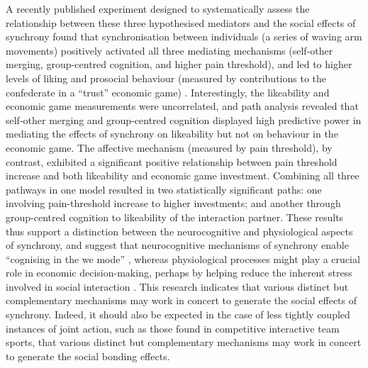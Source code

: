 \begin{CJK}{UTF8}{gbsn}
{A recently published experiment designed to systematically assess the relationship between these three hypothesised mediators and the social effects of synchrony found that synchronisation between individuals (a series of waving arm movements) positively activated all three mediating mechanisms (self-other merging, group-centred cognition, and higher pain threshold), and led to higher levels of liking and prosocial behaviour (measured by contributions to the confederate in a ``trust'' economic game) \citep{Lang2017}.  Interestingly, the likeability and economic game measurements were uncorrelated, and path analysis revealed that self-other merging and group-centred cognition displayed high predictive power
in mediating the effects of synchrony on likeability but not on behaviour in the economic game.  The affective mechanism (measured by pain threshold), by contrast, exhibited a significant positive relationship between pain threshold increase and both likeability and economic game investment.  Combining all three pathways in one model resulted in two statistically significant paths: one involving pain-threshold increase to higher investments; and another through group-centred cognition to likeability of the interaction partner.  These results thus support a distinction between the neurocognitive and physiological aspects of synchrony, and suggest that neurocognitive mechanisms of synchrony enable ``cognising in the we mode'' \citep{Gallotti2013,Hasson2016,Kirschner2010}, whereas physiological processes might play a crucial role in economic decision-making, perhaps by helping reduce the inherent stress involved in social interaction \citep{Mogan2017,Kret2015,Stanley2011}. This research indicates that various distinct but complementary mechanisms may work in concert to generate the social effects of synchrony.  Indeed, it should also be expected in the case of less tightly coupled instances of joint action, such as those found in competitive interactive team sports, that various distinct but complementary mechanisms may work in concert to generate the social bonding effects.



}
\end{CJK}
